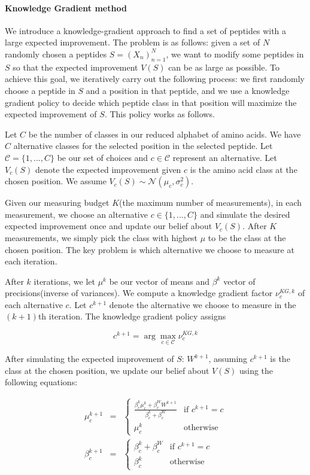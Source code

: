 \documentclass[12pt]{article}
\begin{document}
\paragraph{Knowledge Gradient method}
We introduce a knowledge-gradient approach to find a set of peptides with a large expected improvement. The problem is as follows: given a set of $N$ randomly chosen a peptides $S=(X_n)_{n=1}^N$, we want to modify some peptides in $S$ so that the expected improvement $V(S)$ can be as large as possible. To achieve this goal, we iteratively carry out the following process: we first randomly choose a peptide in $S$ and a position in that peptide, and we use a knowledge gradient policy to decide which peptide class in that position will maximize the expected improvement of $S$. This policy works as follows.

Let $C$ be the number of classes in our reduced alphabet of amino acids. We have $C$ alternative classes for the selected position in the selected peptide. Let $\mathcal{C}=\{1,...,C\}$ be our set of choices and $c\in\mathcal{C}$ represent an alternative. Let $V_c(S)$ denote the expected improvement given $c$ is the amino acid class at the chosen position. We assume $V_c(S)\sim\mathcal{N}(\mu_c,\sigma_c^2)$.

Given our measuring budget $K$(the maximum number of measurements), in each measurement, we choose an alternative $c\in\{1,...,C\}$ and simulate the desired expected improvement once and update our belief about $V_c(S)$. After $K$ measurements, we simply pick the class with highest $\mu$ to be the class at the chosen position. The key problem is which alternative we choose to measure at each iteration.

After $k$ iterations, we let $\mu^k$ be our vector of means and $\beta^k$ vector of precisions(inverse of variances). We compute a knowledge gradient factor $\nu^{KG,k}_c$ of each alternative $c$. Let $c^{k+1}$ denote the alternative we choose to measure in the $(k+1)$th iteration. The knowledge gradient policy assigns

\begin{equation*}
c^{k+1} = \arg\max\limits_{c\in\mathcal{C}}\nu^{KG,k}_c
\end{equation*}

After simulating the expected improvement of $S$: $W^{k+1}$, assuming $c^{k+1}$ is the class at the chosen position, we update our belief about $V(S)$ using the following equations:

\begin{eqnarray*}
\mu_c^{k+1} &=& \left\{\begin{array}{ll}
\frac{\beta_c^k\mu_c^k + \beta_c^W W^{k+1}}{\beta_c^k+\beta_c^W} & \text{if } c^{k+1}=c \\
\mu_c^k & \text{otherwise}\end{array}\right. \\
\beta_c^{k+1} &=& \left\{\begin{array}{ll} 
\beta_c^k + \beta_c^W & \text{if } c^{k+1} = c\\
\beta_c^k & \text{otherwise}\end{array}\right.
\end{eqnarray*}
\end{document}
